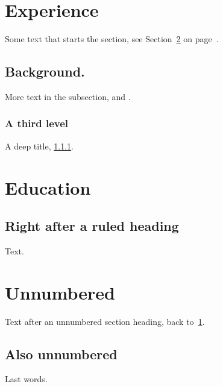 \documentclass[11pt]{article}
\begin{document}
\tableofcontents
\section{Experience}\label{sec:exp}
Some text that starts the section, see Section~\ref{sec:edu} on page~\pageref{sec:edu}.

\subsection{Background.}\label{sec:bg}
More text in the subsection, and .
\subsubsection{A third level}\label{sec:deep}
A deep title, \ref{sec:deep}.
\section{Education}\label{sec:edu}
\subsection{Right after a ruled heading}
Text.
\section*{Unnumbered}
Text after an unnumbered section heading, back to~\ref{sec:exp}.
\subsection*{Also unnumbered}
Last words.
\end{document}
